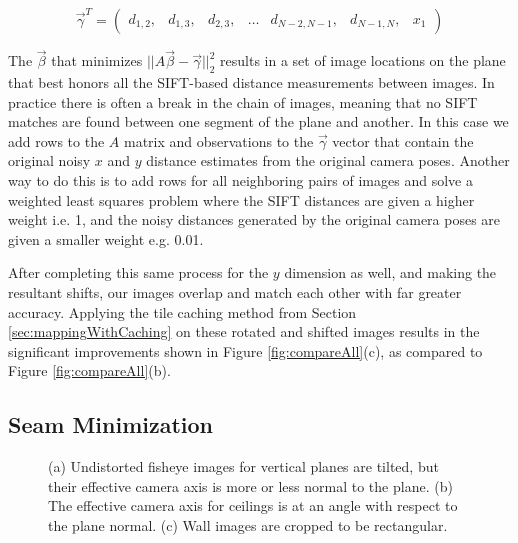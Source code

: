 \documentclass[10pt,twocolumn,letterpaper]{article}
\begin{document}
\[
\vec{\gamma}^T =
\begin{pmatrix}
  d_{1,2}, &d_{1,3}, &d_{2,3}, &\hdots &d_{N-2,N-1}, &d_{N-1,N}, &x_1
\end{pmatrix}
\]

The $\vec{\beta}$ that minimizes $||A \vec{\beta} -
\vec{\gamma}||_2^2$ results in a set of image locations on the plane
that best honors all the SIFT-based distance measurements between
images. In practice there is often a break in
the chain of images, meaning that no SIFT matches are found between
one segment of the plane and another. In this case we add rows to the
$A$ matrix and observations to the $\vec{\gamma}$ vector that contain
the original noisy $x$ and $y$ distance estimates from the original
camera poses. Another way to do this is to add rows for all
neighboring pairs of images and solve a weighted least squares problem
where the SIFT distances are given a higher weight i.e. 1, and the
noisy distances generated by the original camera poses
\cite{chen2010indoor, liu2010indoor} are given a smaller weight
e.g. 0.01.

After completing this same process for the $y$ dimension as well, and
making the resultant shifts, our images overlap and match each other
with far greater accuracy. Applying the tile caching method from
Section \ref{sec:mappingWithCaching} on these rotated and shifted
images results in the significant improvements shown in Figure
\ref{fig:compareAll}(c), as compared to Figure
\ref{fig:compareAll}(b).


\subsection{Seam Minimization}
\label{sec:seamMinimization}

\begin{figure}
  \centering
  \centering
  \centering
  \caption{(a) Undistorted fisheye images for vertical planes are
    tilted, but their effective camera axis is more or less normal to
    the plane. (b) The effective camera axis for ceilings is at an
    angle with respect to the plane normal. (c) Wall images are
    cropped to be rectangular.}
  \label{fig:projectionAngles}
\end{figure}
\end{document}
